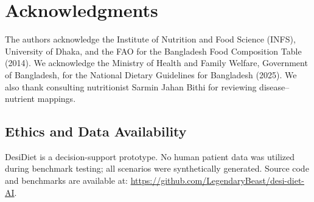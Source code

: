 \documentclass[5p,times,twocolumn]{elsarticle}
\makeatletter
\def\systemname{DesiDiet}%
\def\my@bx{bx}
\def\my@b{b}
\DeclareRobustCommand{\systemname}{%
  \texorpdfstring{%
    \ifx\f@series\my@bx
      DesiDiet%
    \else\ifx\f@series\my@b
      DesiDiet%
    \else
      \textsc{DesiDiet}%
    \fi\fi
  }{DesiDiet}%
}
\makeatother
\begin{document}
\section*{Acknowledgments}
The authors acknowledge the Institute of Nutrition and Food Science (INFS), University of Dhaka, and the FAO for the Bangladesh Food Composition Table (2014). We acknowledge the Ministry of Health and Family Welfare, Government of Bangladesh, for the National Dietary Guidelines for Bangladesh (2025). We also thank consulting nutritionist Sarmin Jahan Bithi for reviewing disease--nutrient mappings.

\subsection*{Ethics and Data Availability}
\systemname{} is a decision-support prototype. No human patient data was utilized during benchmark testing; all scenarios were synthetically generated. Source code and benchmarks are available at: \url{https://github.com/LegendaryBeast/desi-diet-AI}.



\end{document}
